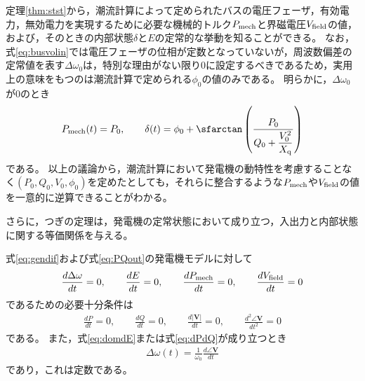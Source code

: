 \documentclass[tombow,dvipdfmx]{corona-a5}
\begin{document}
定理\ref{thm:stst}から，潮流計算によって定められたバスの電圧フェーザ，有効電力，無効電力を実現するために必要な機械的トルク$P_{\rm mech}$と界磁電圧$V_{\rm field}$の値，および，そのときの内部状態$\delta$と$E$の定常的な挙動を知ることができる。
なお，式\ref{eq:busvolin}では電圧フェーザの位相が定数となっていないが，周波数偏差の定常値を表す$\Delta \omega_0$は，特別な理由がない限り0に設定するべきであるため，実用上の意味をもつのは潮流計算で定められる$\phi_0$の値のみである。
明らかに，$\Delta \omega_0$が0のとき
\begin{align*}
P_{{\rm mech}}(t) =    P_0,\qquad
\delta (t)  = \phi_0
+ \sfarctan \left( \frac{P_0}{Q_0 + \frac{ V_0^2}{X_{\rm q}} } \right)
\end{align*}
である。
以上の議論から，潮流計算において発電機の動特性を考慮することなく$(P_0,Q_0,V_0,\phi_0)$を定めたとしても，それらに整合するような$P_{\rm mech}$や$V_{\rm field}$の値を一意的に逆算できることがわかる。

さらに，つぎの定理は，発電機の定常状態において成り立つ，入出力と内部状態に関する等価関係を与える。

\begin{定理}[発電機の入出力と内部状態に関する等価関係]
\label{thm:outst}
式\ref{eq:gendif}および式\ref{eq:PQout}の発電機モデルに対して
\begin{align}\label{eq:domdE}
\frac{d\Delta \omega}{dt}=0
,\qquad
\frac{dE}{dt}=0
,\qquad
\frac{d P_{\rm mech}}{dt}=0
,\qquad
\frac{d V_{\rm field}}{dt}=0
\end{align}
であるための必要十分条件は
\begin{align}\label{eq:dPdQ}
\frac{dP}{dt}=0
,\qquad
\frac{dQ}{dt}=0
,\qquad
\frac{d|\bm{V}|}{dt}=0
,\qquad
\frac{d^2 \angle \bm{V}}{dt^2}=0
\end{align}
である。
また，式\ref{eq:domdE}または式\ref{eq:dPdQ}が成り立つとき
\begin{align}\label{eq:frer}
\Delta \omega(t)= \frac{1}{\omega_0}\frac{d \angle \bm{V}}{dt}
\end{align}
であり，これは定数である。
\end{定理}
\end{document}
